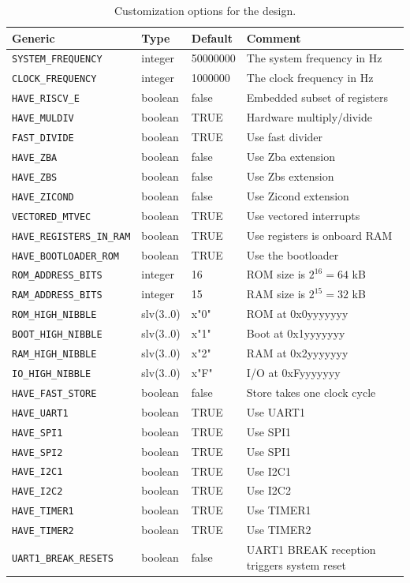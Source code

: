 \documentclass[12pt]{article}
\begin{document}
\begin{table}[!ht]
\caption{Customization options for the design.}
\label{tab:custom}
\centering
\begin{tabular}{lllp{5.5cm}}
\toprule
Generic & Type & Default & Comment \\
\midrule
\lstinline|SYSTEM_FREQUENCY| & integer & 50000000 & The system frequency in Hz \\
\lstinline|CLOCK_FREQUENCY| & integer & 1000000 & The clock frequency in Hz \\
\lstinline|HAVE_RISCV_E| & boolean & false & Embedded subset of registers\\
\lstinline|HAVE_MULDIV| & boolean & TRUE &  Hardware multiply/divide \\
\lstinline|FAST_DIVIDE| & boolean & TRUE & Use fast divider\\
\lstinline|HAVE_ZBA| & boolean & false & Use Zba extension \\
\lstinline|HAVE_ZBS| & boolean & false & Use Zbs extension \\
\lstinline|HAVE_ZICOND| & boolean & false & Use Zicond extension \\
\lstinline|VECTORED_MTVEC| & boolean & TRUE & Use vectored interrupts\\
\lstinline|HAVE_REGISTERS_IN_RAM| & boolean & TRUE & Use registers is onboard RAM\\
\lstinline|HAVE_BOOTLOADER_ROM| & boolean & TRUE & Use the bootloader\\
\lstinline|ROM_ADDRESS_BITS| & integer & 16 & ROM size is $2^{16} = 64$ kB \\
\lstinline|RAM_ADDRESS_BITS| & integer & 15 & RAM size is $2^{15} = 32$ kB \\
\lstinline|ROM_HIGH_NIBBLE| & slv(3..0) & x"0" & ROM at 0x0yyyyyyy\\
\lstinline|BOOT_HIGH_NIBBLE| & slv(3..0) & x"1" & Boot at 0x1yyyyyyy\\
\lstinline|RAM_HIGH_NIBBLE| & slv(3..0) & x"2" & RAM at 0x2yyyyyyy\\
\lstinline|IO_HIGH_NIBBLE| & slv(3..0) & x"F" & I/O at 0xFyyyyyyy\\
\lstinline|HAVE_FAST_STORE| & boolean & false & Store takes one clock cycle \\
\lstinline|HAVE_UART1| & boolean & TRUE & Use UART1 \\
\lstinline|HAVE_SPI1| & boolean & TRUE & Use SPI1 \\
\lstinline|HAVE_SPI2| & boolean & TRUE & Use SPI1 \\
\lstinline|HAVE_I2C1| & boolean & TRUE & Use I2C1 \\
\lstinline|HAVE_I2C2| & boolean & TRUE & Use I2C2 \\
\lstinline|HAVE_TIMER1| & boolean & TRUE & Use TIMER1\\
\lstinline|HAVE_TIMER2| & boolean & TRUE & Use TIMER2\\
\lstinline|UART1_BREAK_RESETS| & boolean & false & UART1 BREAK reception triggers system reset\\
\bottomrule
\end{tabular}
\end{table}
\end{document}
